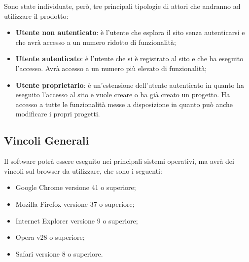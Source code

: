 \noindent Sono state individuate, però, tre principali tipologie di attori che andranno ad utilizzare il prodotto:
\begin{itemize}
	\item \textbf{Utente non autenticato}: è l'utente che esplora il sito senza autenticarsi e che avrà accesso a un numero ridotto di funzionalità;
	\item \textbf{Utente autenticato}: è l'utente che si è registrato al sito e che ha eseguito l'accesso. Avrà accesso a un numero più elevato di funzionalità;
	\item \textbf{Utente proprietario}: è un'estensione dell'utente autenticato in quanto ha eseguito l'accesso al sito e vuole creare o ha già creato un progetto. Ha accesso a tutte le funzionalità messe a disposizione in quanto può anche modificare i propri progetti.
\end{itemize}

\subsection{Vincoli Generali}
Il software potrà essere eseguito nei principali sistemi operativi, ma avrà dei vincoli sul \gls{browser} da utilizzare, che sono i seguenti:
\begin{itemize}
	\item Google Chrome versione 41 o superiore;
	\item Mozilla Firefox versione 37 o superiore;
	\item Internet Explorer versione 9 o superiore;
	\item Opera v28 o superiore;
	\item Safari versione 8 o superiore.
\end{itemize}

